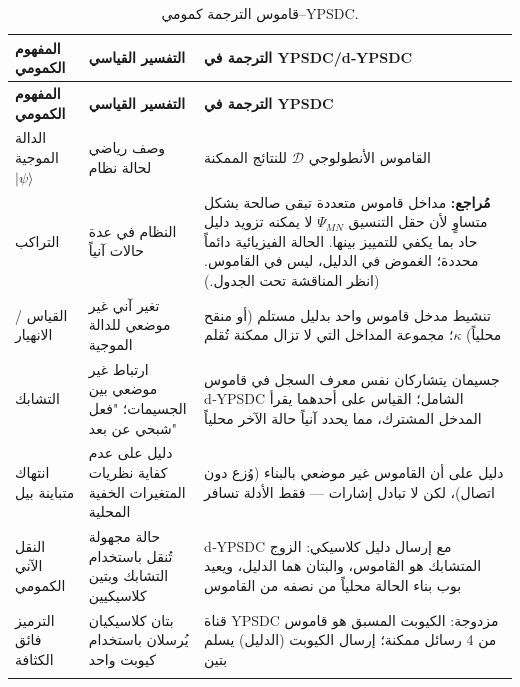 \documentclass[12pt,a4paper]{article}
\theoremstyle{remark}
\begin{document}
	\begin{longtable}{p{3.5cm} p{5cm} p{7cm}}
		\caption{قاموس الترجمة كمومي–YPSDC.}\label{tab:quantum-dict}\\
		\toprule
		\textbf{المفهوم الكمومي} & \textbf{التفسير القياسي} & \textbf{الترجمة في YPSDC/d‑YPSDC} \\
		\midrule
		\endfirsthead
		
		\toprule
		\textbf{المفهوم الكمومي} & \textbf{التفسير القياسي} & \textbf{الترجمة في YPSDC} \\
		\midrule
		\endhead
		
		\hline
		\endfoot
		
		\bottomrule
		\endlastfoot
		
		الدالة الموجية \(|\psi\rangle\) &
		وصف رياضي لحالة نظام &
		القاموس الأنطولوجي \(\mathcal{D}\) للنتائج الممكنة \\
		\addlinespace
		
		التراكب &
		النظام في عدة حالات آنياً &
		\textbf{مُراجع:} مداخل قاموس متعددة تبقى صالحة بشكل متساوٍ لأن حقل التنسيق \(\Psi_{MN}\) لا يمكنه تزويد دليل حاد بما يكفي للتمييز بينها. الحالة الفيزيائية دائماً محددة؛ الغموض في الدليل، ليس في القاموس. (انظر المناقشة تحت الجدول.) \\
		\addlinespace
		
		القياس / الانهيار &
		تغير آني غير موضعي للدالة الموجية &
		تنشيط مدخل قاموس واحد بدليل مستلم (أو منقح محلياً) \(\kappa\)؛ مجموعة المداخل التي لا تزال ممكنة تُقلم \\
		\addlinespace
		
		التشابك &
		ارتباط غير موضعي بين الجسيمات؛ "فعل شبحي عن بعد" &
		جسيمان يتشاركان نفس معرف السجل في قاموس d‑YPSDC الشامل؛ القياس على أحدهما يقرأ المدخل المشترك، مما يحدد آنياً حالة الآخر محلياً \\
		\addlinespace
		
		انتهاك متباينة بيل &
		دليل على عدم كفاية نظريات المتغيرات الخفية المحلية &
		دليل على أن القاموس غير موضعي بالبناء (وُزع دون اتصال)، لكن لا تبادل إشارات — فقط الأدلة تسافر \\
		\addlinespace
		
		النقل الآني الكمومي &
		حالة مجهولة تُنقل باستخدام التشابك وبتين كلاسيكيين &
		d‑YPSDC مع إرسال دليل كلاسيكي: الزوج المتشابك هو القاموس، والبتان هما الدليل، ويعيد بوب بناء الحالة محلياً من نصفه من القاموس \\
		\addlinespace
		
		الترميز فائق الكثافة &
		بتان كلاسيكيان يُرسلان باستخدام كيوبت واحد &
		قناة YPSDC مزدوجة: الكيوبت المسبق هو قاموس من 4 رسائل ممكنة؛ إرسال الكيوبت (الدليل) يسلم بتين \\
		\addlinespace
		

\end{longtable}
\end{document}
